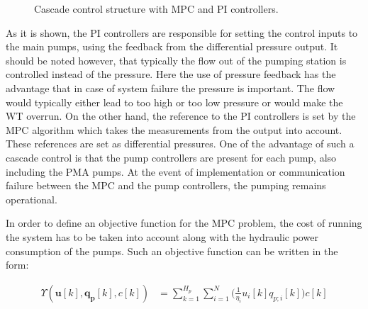 \begin{figure}[H]
\centering
 
\caption{Cascade control structure with MPC and PI controllers.}
\label{fig:control_structure}
\end{figure}

As it is shown, the PI controllers are responsible for setting the control inputs to the main pumps, using the feedback from the differential pressure output. It should be noted however, that typically the flow out of the pumping station is controlled instead of the pressure. Here the use of pressure feedback has the advantage that in case of system failure the pressure is important. The flow would typically either lead to too high or too low pressure or would make the WT overrun. On the other hand, the reference to the PI controllers is set by the MPC algorithm which takes the measurements from the output into account. These references are set as differential pressures. One of the advantage of such a cascade control is that the pump controllers are present for each pump, also including the PMA pumps. At the event of implementation or communication failure between the MPC and the pump controllers, the pumping remains operational. 
 



In order to define an objective function for the MPC problem, the cost of running the system has to be taken into account along with the hydraulic power consumption of the pumps. Such an objective function can be written in the form: 

\begin{align}
 \Upsilon(\pmb{u}[k],\pmb{q_p}[k],c[k]) &=  \sum_{k=1}^{H_p} \sum_{i=1}^{N} \Big(\frac{1}{\eta_i} u_i[k]  q_{p;i}[k]\Big) c[k] \label{eqcost} 
\end{align}



